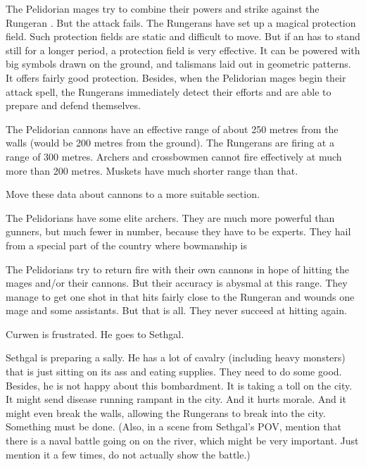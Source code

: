 The Pelidorian \ishrah mages try to combine their powers and strike against the Rungeran \ishrah. 
But the attack fails. 
The Rungerans have set up a magical protection field. 
Such protection fields are static and difficult to move.
But if an \ishrah has to stand still for a longer period, a protection field is very effective. 
It can be powered with big symbols drawn on the ground, and talismans laid out in geometric patterns. 
It offers fairly good protection. 
Besides, when the Pelidorian mages begin their attack spell, the Rungerans immediately detect their efforts and are able to prepare and defend themselves. 

The Pelidorian cannons have an effective range of about 250 metres from the walls (would be 200 metres from the ground).
The Rungerans are firing at a range of 300 metres. 
Archers and crossbowmen cannot fire effectively at much more than 200 metres. 
Muskets have much shorter range than that. 

Move these data about cannons to a more suitable section. 

The Pelidorians have some elite archers. 
They are much more powerful than gunners, but much fewer in number, because they have to be experts.
They hail from a special part of the country where bowmanship is 

The Pelidorians try to return fire with their own cannons in hope of hitting the mages and/or their cannons.
But their accuracy is abysmal at this range. 
They manage to get one shot in that hits fairly close to the Rungeran \ishrah and wounds one mage and some assistants. 
But that is all. 
They never succeed at hitting again. 




\begin{comment}
  \section{Sethgal and Curwen plan sally}
\end{comment}
\new
Curwen is frustrated. 
He goes to Sethgal.

Sethgal is preparing a sally.
He has a lot of cavalry (including heavy monsters) that is just sitting on its ass and eating supplies.
They need to do some good. 
Besides, he is not happy about this bombardment. 
It is taking a toll on the city.
It might send disease running rampant in the city.
And it hurts morale.
And it might even break the walls, allowing the Rungerans to break into the city.
Something must be done. 
(Also, in a scene from Sethgal's POV, mention that there is a naval battle going on on the river, which might be very important. Just mention it a few times, do not actually show the battle.)

